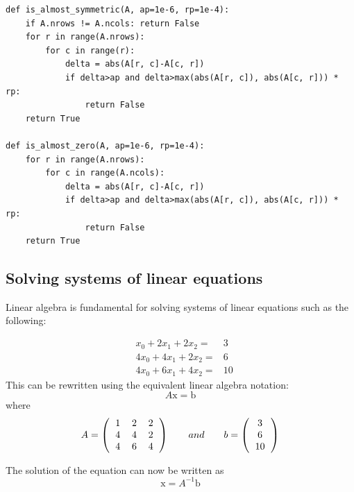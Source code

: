 \documentclass[justified, sixbynine]{tufte-book}
\def\ft{\small\tt}
\theoremstyle{plain}%
\newtheorem * {corollary}{Corollary}
\theoremstyle{definition}
\theoremstyle{remark}
\newtheorem * {remark}{Remark}
\newtheorem * {note}{Note}
\begin{document}
\begin{fullwidth}
\begin{lstlisting}[caption={in file: {\ft nlib.py}}]
def is_almost_symmetric(A, ap=1e-6, rp=1e-4):
    if A.nrows != A.ncols: return False
    for r in range(A.nrows):
        for c in range(r):
            delta = abs(A[r, c]-A[c, r])
            if delta>ap and delta>max(abs(A[r, c]), abs(A[c, r])) * rp:
                return False
    return True

def is_almost_zero(A, ap=1e-6, rp=1e-4):
    for r in range(A.nrows):
        for c in range(A.ncols):
            delta = abs(A[r, c]-A[c, r])
            if delta>ap and delta>max(abs(A[r, c]), abs(A[c, r])) * rp:
                return False
    return True
\end{lstlisting}

\goodbreak\subsection{Solving systems of linear equations}


Linear algebra is fundamental for solving systems of linear equations such as the following:

\begin{eqnarray}
&x_0+2x_1+2x_2=&3 \\
&4x_0+4x_1+2x_2=&6 \\
&4x_0+6x_1+4x_2=&10
\end{eqnarray}
This can be rewritten using the equivalent linear algebra notation:
\begin{equation}
A \textrm{x} = \textrm{b}
\end{equation}
where
\begin{equation}
A = \left(\begin{tabular}{ccc}
1 & 2 & 2 \\
4 & 4 & 2 \\
4 & 6 & 4 \\
\end{tabular}\right) \qquad and \qquad
b =
\left(\begin{tabular}{c}
3 \\
6 \\
10 \\
\end{tabular}\right)
\end{equation}

The solution of the equation can now be written as
\begin{equation}
\textrm{x} = A^{-1}\textrm{b}
\end{equation}


\end{fullwidth}
\end{document}
